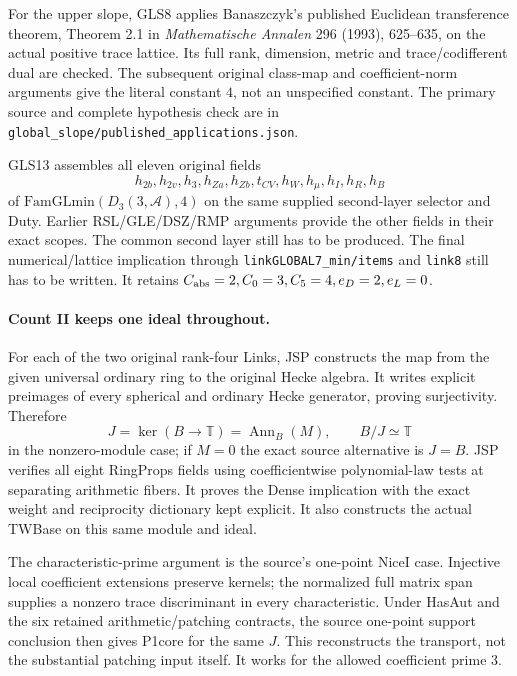 For the upper slope, GLS8 applies Banaszczyk's published Euclidean
transference theorem, Theorem 2.1 in \emph{Mathematische Annalen}
296 (1993), 625--635, on the actual positive trace lattice.
Its full rank, dimension, metric and trace/codifferent dual are
checked. The subsequent original class-map and coefficient-norm
arguments give the literal constant $4$, not an unspecified
constant. The primary source and complete hypothesis check are in
\texttt{global\_slope/published\_applications.json}.

GLS13 assembles all eleven original fields
\[
 h_{2b},h_{2v},h_3,h_{Za},h_{Zb},t_{CV},h_W,h_\mu,h_I,h_R,h_B
\]
of $\mathrm{FamGLmin}(D_3(3,\mathcal A),4)$ on the same supplied
second-layer selector and Duty. Earlier RSL/GLE/DSZ/RMP arguments
provide the other fields in their exact scopes. The common second
layer still has to be produced. The final numerical/lattice
implication through \texttt{linkGLOBAL7\_min/items} and
\texttt{link8} still has to be written. It retains
$C_{\rm abs}=2,C_0=3,C_5=4,e_D=2,e_L=0$.

\paragraph{Count II keeps one ideal throughout.}
For each of the two original rank-four Links, JSP constructs the
map from the given universal ordinary ring to the original Hecke
algebra. It writes explicit preimages of every spherical and
ordinary Hecke generator, proving surjectivity. Therefore
\[
          J=\ker(B\longrightarrow\mathbb T)
                        =\operatorname{Ann}_B(M),\qquad
                         B/J\simeq\mathbb T
 \tag{AU33.4}
\]
in the nonzero-module case; if $M=0$ the exact source alternative
is $J=B$. JSP verifies all eight RingProps fields using coefficientwise
polynomial-law tests at separating arithmetic fibers. It proves
the Dense implication with the exact weight and reciprocity
dictionary kept explicit. It also constructs the actual TWBase on
this same module and ideal.

The characteristic-prime argument is the source's one-point NiceI
case. Injective local coefficient extensions preserve kernels;
the normalized full matrix span supplies a nonzero trace
discriminant in every characteristic. Under HasAut and the six
retained arithmetic/patching contracts, the source one-point
support conclusion then gives P1core for the same $J$.
This reconstructs the transport, not the substantial patching
input itself. It works for the allowed coefficient prime $3$.

